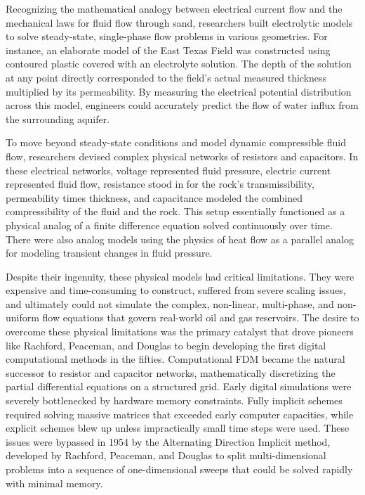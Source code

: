Recognizing the mathematical analogy between electrical current flow and the mechanical laws for fluid flow through sand, researchers built electrolytic models to solve steady-state, single-phase flow problems in various geometries. For instance, an elaborate model of the East Texas Field was constructed using contoured plastic covered with an electrolyte solution. The depth of the solution at any point directly corresponded to the field's actual measured thickness multiplied by its permeability. By measuring the electrical potential distribution across this model, engineers could accurately predict the flow of water influx from the surrounding aquifer.

To move beyond steady-state conditions and model dynamic compressible fluid flow, researchers devised complex physical networks of resistors and capacitors. In these electrical networks, voltage represented fluid pressure, electric current represented fluid flow, resistance stood in for the rock's transmissibility, permeability times thickness, and capacitance modeled the combined compressibility of the fluid and the rock. This setup essentially functioned as a physical analog of a finite difference equation solved continuously over time. There were also analog models using the physics of heat flow as a parallel analog for modeling transient changes in fluid pressure.

Despite their ingenuity, these physical models had critical limitations. They were expensive and time-consuming to construct, suffered from severe scaling issues, and ultimately could not simulate the complex, non-linear, multi-phase, and non-uniform flow equations that govern real-world oil and gas reservoirs. The desire to overcome these physical limitations was the primary catalyst that drove pioneers like Rachford, Peaceman, and Douglas to begin developing the first digital computational methods in the fifties. Computational FDM became the natural successor to resistor and capacitor networks, mathematically discretizing the partial differential equations on a structured grid. Early digital simulations were severely bottlenecked by hardware memory constraints. Fully implicit schemes required solving massive matrices that exceeded early computer capacities, while explicit schemes blew up unless impractically small time steps were used. These issues were bypassed in 1954 by the Alternating Direction Implicit method, developed by Rachford, Peaceman, and Douglas to split multi-dimensional problems into a sequence of one-dimensional sweeps that could be solved rapidly with minimal memory.

